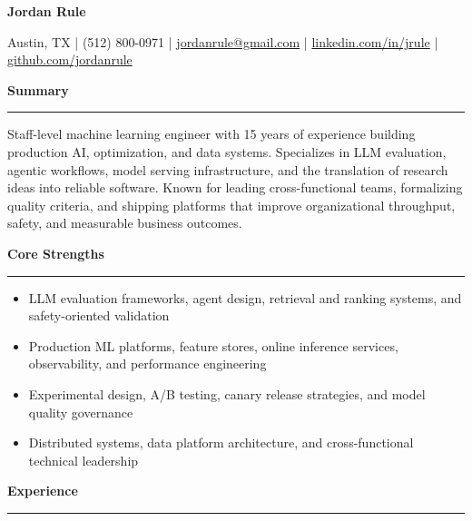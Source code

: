\documentclass[10pt,letterpaper]{article}
\newcommand{\nameheader}[1]{%
  {\LARGE \textbf{#1}}\par
}
\newcommand{\contactline}[1]{%
  {\small #1}\par
}
\newcommand{\sectiontitle}[1]{%
  \vspace{0.6em}
  {\large \textbf{#1}}\par
  \vspace{0.15em}
  \hrule
  \vspace{0.35em}
}
\begin{document}
\nameheader{Jordan Rule}
\contactline{Austin, TX \;|\; (512) 800-0971 \;|\; \href{mailto:jordanrule@gmail.com}{jordanrule@gmail.com} \;|\; \href{https://www.linkedin.com/in/jrule/}{linkedin.com/in/jrule} \;|\; \href{https://github.com/jordanrule}{github.com/jordanrule}}

\sectiontitle{Summary}
Staff-level machine learning engineer with 15 years of experience building production AI, optimization, and data systems. Specializes in LLM evaluation, agentic workflows, model serving infrastructure, and the translation of research ideas into reliable software. Known for leading cross-functional teams, formalizing quality criteria, and shipping platforms that improve organizational throughput, safety, and measurable business outcomes.

\sectiontitle{Core Strengths}
\begin{itemize}
  \item LLM evaluation frameworks, agent design, retrieval and ranking systems, and safety-oriented validation
  \item Production ML platforms, feature stores, online inference services, observability, and performance engineering
  \item Experimental design, A/B testing, canary release strategies, and model quality governance
  \item Distributed systems, data platform architecture, and cross-functional technical leadership
\end{itemize}

\sectiontitle{Experience}
\end{document}
